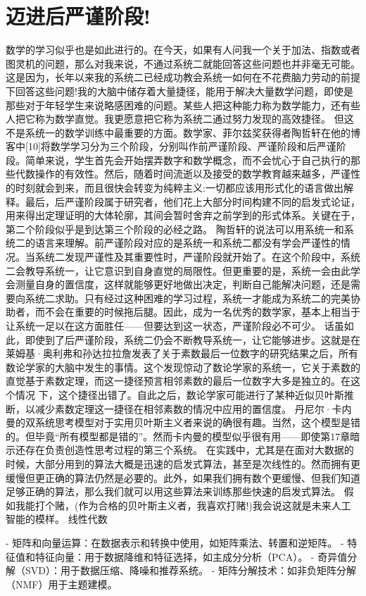 \section{迈进后严谨阶段!}
数学的学习似乎也是如此进行的。在今天，如果有人问我一个关于加法、指数或者图灵机的问题，那么对我来说，不通过系统二就能回答这些问题也并非毫无可能。这是因为，长年以来我的系统二已经成功教会系统一如何在不花费脑力劳动的前提下回答这些问题!我的大脑中储存着大量捷径，能用于解决大量数学问题，即使是那些对于年轻学生来说略感困难的问题。某些人把这种能力称为数学能力，还有些人把它称为数学直觉。我更愿意把它称为系统二通过努力发现的高效捷径。
但这不是系统一的数学训练中最重要的方面。数学家、菲尔兹奖获得者陶哲轩在他的博客中[10]将数学学习分为三个阶段，分别叫作前严谨阶段、严谨阶段和后严谨阶段。简单来说，学生首先会开始摆弄数字和数学概念，而不会忧心于自己执行的那些代数操作的有效性。然后，随着时间流逝以及接受的数学教育越来越多，严谨性的时刻就会到来，而且很快会转变为纯粹主义:一切都应该用形式化的语言做出解释。最后，后严谨阶段属于研究者，他们花上大部分时间构建不同的启发式论证，用来得出定理证明的大体轮廓，其间会暂时舍弃之前学到的形式体系。关键在于，第二个阶段似乎是到达第三个阶段的必经之路。
陶哲轩的说法可以用系统一和系统二的语言来理解。前严谨阶段对应的是系统一和系统二都没有学会严谨性的情况。当系统二发现严谨性及其重要性时，严谨阶段就开始了。在这个阶段中，系统二会教导系统一，让它意识到自身直觉的局限性。但更重要的是，系统一会由此学会测量自身的置信度，这样就能够更好地做出决定，判断自己能解决问题，还是需要向系统二求助。只有经过这种困难的学习过程，系统一才能成为系统二的完美协助者，而不会在重要的时候拖后腿。因此，成为一名优秀的数学家，基本上相当于让系统一足以在这方面胜任——但要达到这一状态，严谨阶段必不可少。
话虽如此，即使到了后严谨阶段，系统二仍会不断教导系统一，让它能够进步。这就是在莱姆基·奥利弗和孙达拉拉詹发表了关于素数最后一位数字的研究结果之后，所有数论学家的大脑中发生的事情。这个发现惊动了数论学家的系统一，它关于素数的直觉基于素数定理，而这一捷径预言相邻素数的最后一位数字大多是独立的。在这个情况
下，这个捷径出错了。自此之后，数论学家可能进行了某种近似贝叶斯推断，以减少素数定理这一捷径在相邻素数的情况中应用的置信度。
丹尼尔·卡内曼的双系统思考模型对于实用贝叶斯主义者来说的确很有趣。当然，这个模型是错的。但毕竟“所有模型都是错的”。然而卡内曼的模型似乎很有用——即使第17章暗示还存在负责创造性思考过程的第三个系统。
在实践中，尤其是在面对大数据的时候，大部分用到的算法大概是迅速的启发式算法，甚至是次线性的。然而拥有更缓慢但更正确的算法仍然是必要的。此外，如果我们拥有数个更缓慢、但我们知道足够正确的算法，那么我们就可以用这些算法来训练那些快速的启发式算法。
假如我能打个赌，(作为合格的贝叶斯主义者，我喜欢打赌!)我会说这就是未来人工智能的模样。
线性代数

- 矩阵和向量运算：在数据表示和转换中使用，如矩阵乘法、转置和逆矩阵。
- 特征值和特征向量：用于数据降维和特征选择，如主成分分析（PCA）。
- 奇异值分解（SVD）：用于数据压缩、降噪和推荐系统。
- 矩阵分解技术：如非负矩阵分解（NMF）用于主题建模。

\nocite{*}
\printbibliography[heading=bibintoc, title=\ebibname]
\appendix

\newpage
